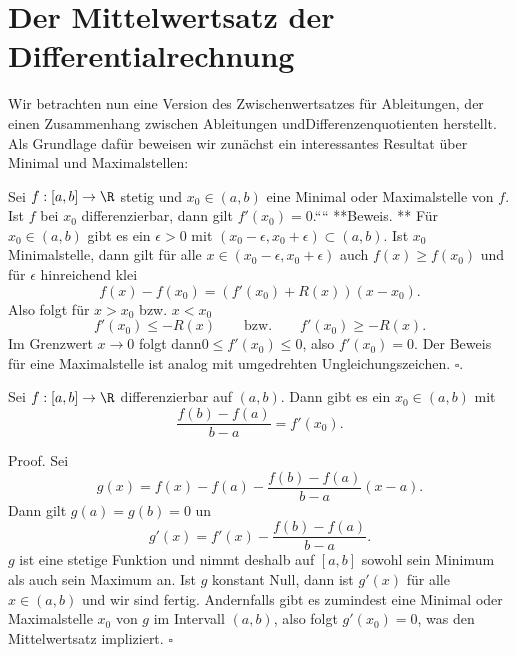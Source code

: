 \documentclass[letterpaper,10pt,english]{jupyterBook}
\begin{document}
\section{Der Mittelwertsatz der Differentialrechnung}
\label{\detokenize{differential/mws:der-mittelwertsatz-der-differentialrechnung}}\label{\detokenize{differential/mws::doc}}
Wir betrachten nun eine Version des Zwischenwertsatzes für Ableitungen, der einen Zusammenhang zwischen Ableitungen undDifferenzenquotienten herstellt. Als Grundlage dafür beweisen wir zunächst ein interessantes Resultat über Minimal  und Maximalstellen:
\label{differential/mws:lemma-0}
\begin{emphBox}{}{}{}



Sei \(f:[a,b] \rightarrow \R\) stetig und \(x_0 \in (a,b)\) eine Minimal  oder Maximalstelle von \(f\). Ist \(f\) bei \(x_0\) differenzierbar, dann gilt \(f'(x_0) = 0\).````
**Beweis. ** Für \(x_0 \in (a,b)\) gibt es ein \(\epsilon > 0\) mit \((x_0 - \epsilon, x_0 + \epsilon) \subset (a,b)\). Ist \(x_0\) Minimalstelle, dann gilt für alle \(x \in (x_0 - \epsilon, x_0 + \epsilon)\) auch \(f(x) \geq f(x_0)\) und für \(\epsilon\) hinreichend klei
\begin{equation*}
 f(x) - f(x_0) = (f'(x_0) + R(x))(x-x_0).
\end{equation*}
Also folgt für \(x > x_0\) bzw. \(x < x_0\)
\begin{equation*}
 f'(x_0) \leq -  R(x) \qquad \text{bzw.} \qquad f'(x_0) \geq  - R(x).
\end{equation*}
Im Grenzwert \(x \rightarrow 0\) folgt dann\( 0 \leq f'(x_0) \leq 0\), also \(f'(x_0) = 0\). Der Beweis für eine Maximalstelle ist analog mit umgedrehten Ungleichungszeichen. \(\square\).
\label{differential/mws:theorem-1}
\begin{lemma}{}{}



Sei \(f:[a,b] \rightarrow \R\) differenzierbar auf \((a,b)\). Dann gibt es ein \(x_0 \in (a,b)\) mit
\begin{equation*}
 \frac{f(b) - f(a)}{b-a} = f'(x_0) .
\end{equation*}\end{lemma}
\end{emphBox}

\begin{emphBox}{}{}
Proof. Sei
\begin{equation*}
 g(x) = f(x) - f(a) - \frac{f(b) - f(a)}{b-a}(x-a).
\end{equation*}
Dann gilt \(g(a) = g(b) = 0\) un
\begin{equation*}
 g'(x) = f'(x) -  \frac{f(b) - f(a)}{b-a}.
\end{equation*}
\(g\) ist eine stetige Funktion und nimmt deshalb auf \([a,b]\) sowohl sein Minimum als auch sein Maximum an. Ist \(g\) konstant Null, dann ist \(g'(x)\) für alle \(x \in (a,b)\) und wir sind fertig. Andernfalls gibt es zumindest eine Minimal  oder Maximalstelle \(x_0\) von \(g\) im Intervall \((a,b)\), also folgt \(g'(x_0)=0\), was den Mittelwertsatz impliziert. \(\square\)
\end{emphBox}
\end{document}
